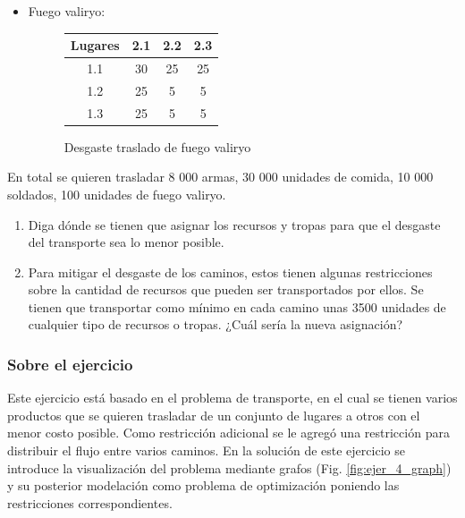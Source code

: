 \documentclass[a4paper,10pt,twocolumn]{article}
\theoremstyle{theorem}
\theoremstyle{definition}
\theoremstyle{remark}
\begin{document}
\begin{itemize}
\item Fuego valiryo:

\begin{figure}[h!]%
	\begin{center}
		\begin{tabular}{|c|c|c|c|} \hline
		Lugares	& 2.1		& 2.2		& 2.3	\\ \hline
		1.1		& 30		& 25		& 25	\\ \hline
		1.2		& 25		&  5		&  5	\\ \hline
		1.3		& 25		&  5		&  5	\\ \hline
		\end{tabular}
	\caption{Desgaste traslado de fuego valiryo}\label{fig:ejer_4_4}
	\end{center}
\end{figure}


\end{itemize}

En total se quieren trasladar 8 000 armas, 30 000 unidades de comida, 10 000 soldados, 100 unidades de fuego valiryo.

\renewcommand{\theenumi}{\alph{enumi}} %

\begin{enumerate}

	\item Diga dónde se tienen que asignar los recursos y tropas para que el desgaste del transporte sea lo menor posible.
	\item Para mitigar el desgaste de los caminos, estos tienen algunas restricciones sobre la cantidad de recursos que pueden ser 
	transportados por ellos. Se tienen que transportar como mínimo en cada camino unas 3500 unidades de cualquier tipo de recursos o tropas. 
	¿Cuál sería la nueva asignación?

\end{enumerate}

		\subsubsection{Sobre el ejercicio}\label{subsubsec:sobre_ejer_4}

Este ejercicio está basado en el problema de transporte, en el cual se tienen varios productos que se quieren trasladar de un conjunto de lugares a otros con el menor costo posible. Como restricción adicional se le agregó una restricción para distribuir el flujo entre varios caminos. En la solución de este ejercicio se introduce la visualización del problema mediante grafos (Fig. \ref{fig:ejer_4_graph}) y su posterior modelación como problema de optimización poniendo las restricciones correspondientes.
\end{document}
